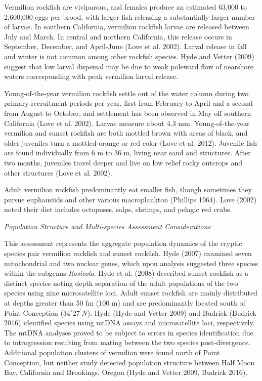 \documentclass[
  english,
  a4paper,
]{article}
\begin{document}
Vermilion rockfish are viviparous, and females produce an estimated 63,000 to 2,600,000 eggs per brood, with larger fish releasing a substantially larger number of larvae.
In southern California, vermilion rockfish larvae are released between July and March.
In central and northern California, this release occurs in September, December, and
April-June (Love et al. 2002). Larval release in fall and winter is not common among other
rockfish species. Hyde and Vetter (2009) suggest that low larval dispersal may
be due to weak poleward flow of nearshore waters corresponding with peak vermilion larval release.

Young-of-the-year vermilion rockfish settle out of the water column during two primary recruitment
periods per year, first from February to April and a second from August to October,
and settlement has been observed in May off southern California (Love et al. 2002). Larvae
measure about 4.3 mm. Young-of-the-year vermilion and sunset rockfish are both mottled
brown with areas of black, and older juveniles turn a mottled orange or red color (Love et al. 2012).
Juvenile fish are found individually from 6 m to 36 m, living near sand and structures.
After two months, juveniles travel deeper and live on low relief rocky outcrops and
other structures (Love et al. 2002).

Adult vermilion rockfish predominantly eat smaller fish, though sometimes they pursue
euphausiids and other various macroplankton (Phillips 1964). Love (2002) noted
their diet includes octopuses, salps, shrimps, and pelagic red crabs.

\emph{Population Structure and Multi-species Assessment Considerations}

This assessment represents the aggregate population dynamics of the cryptic species pair vermilion rockfish
and sunset rockfish.
Hyde (2007) examined seven mitochondrial and two nuclear genes, which upon analysis suggested
three species within the subgenus \emph{Rosicola}. Hyde et al. (2008) described sunset rockfish as a distinct species noting depth separation
of the adult populations of the two species using nine microsatellite loci.
Adult sunset rockfish are mainly distributed at depths
greater than 50 fm (100 m) and are predominantly located south of Point Conception ($34^\circ 27^\prime N$).
Hyde (Hyde and Vetter 2009) and Budrick (Budrick 2016) identified species using mtDNA assays and microsatellite loci,
respectively. The mtDNA analyses proved to be subject to errors in species identification due to introgression resulting from mating between the two species post-divergence.
Additional population clusters of vermilion were found north of Point Conception, but neither
study detected population structure between Half Moon Bay, California and Brookings,
Oregon (Hyde and Vetter 2009, Budrick 2016).
\end{document}
